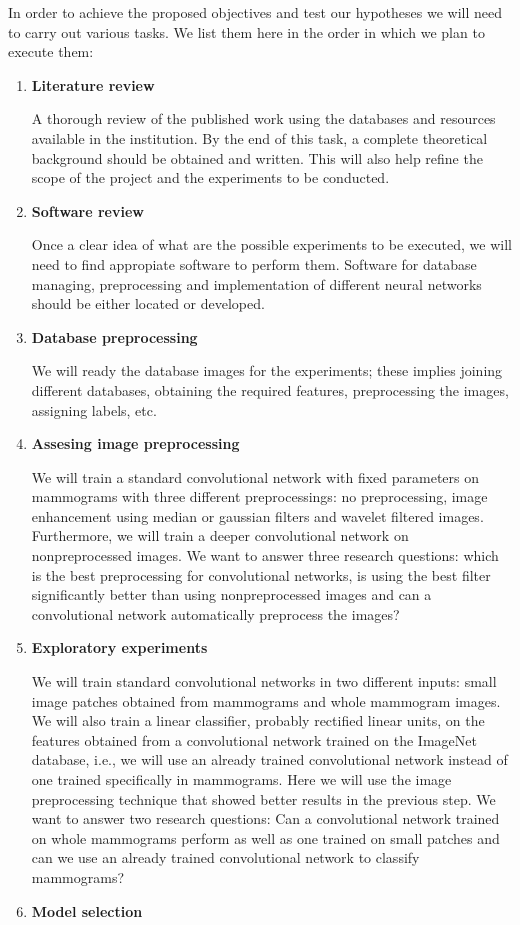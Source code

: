 In order to achieve the proposed objectives and test our hypotheses we will need to carry out various tasks. We list them here in the order in which we plan to execute them:

\begin{enumerate}
	\item \textbf{Literature review}

A thorough review of the published work using the databases and resources available in the institution. By the end of this task, a complete theoretical background should be obtained and written. This will also help refine the scope of the project and the experiments to be conducted.
	\item \textbf{Software review}

Once a clear idea of what are the possible experiments to be executed, we will need to find appropiate software to perform them. Software for database managing, preprocessing and implementation of different neural networks should be either located or developed.
	\item \textbf{Database preprocessing}

We will ready the database images for the experiments; these implies joining different databases, obtaining the required features, preprocessing the images, assigning labels, etc.
	\item \textbf{Assesing image preprocessing}

We will train a standard convolutional network with fixed parameters on mammograms with three different preprocessings: no preprocessing, image enhancement using median or gaussian filters and wavelet filtered images. Furthermore, we will train a deeper convolutional network on nonpreprocessed images. We want to answer three research questions: which is the best preprocessing for convolutional networks, is using the best filter significantly better than using nonpreprocessed images and can a convolutional network automatically preprocess the images?
	\item \textbf{Exploratory experiments}

We will train standard convolutional networks in two different inputs: small image patches obtained from mammograms and whole mammogram images. We will also train a linear classifier, probably rectified linear units, on the features obtained from a convolutional network trained on the ImageNet database, i.e., we will use an already trained convolutional network instead of one trained specifically in mammograms. Here we will use the image preprocessing technique that showed better results in the previous step. We want to answer two research questions: Can a convolutional network trained on whole mammograms perform as well as one trained on small patches and can we use an already trained convolutional network to classify mammograms?
	\item \textbf{Model selection}


\end{enumerate}
